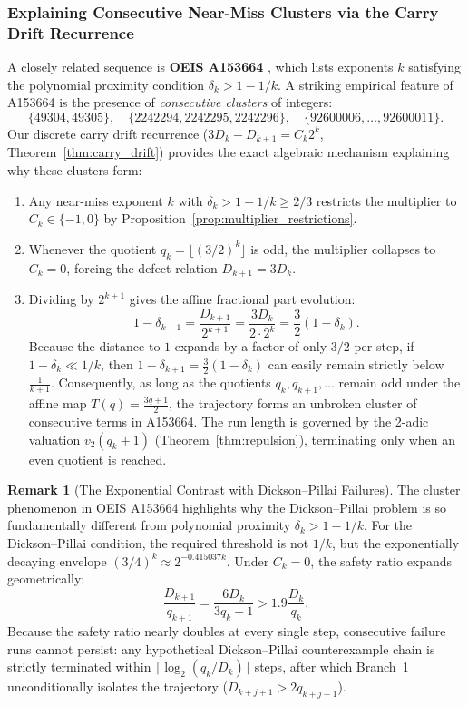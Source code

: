 \documentclass[11pt,reqno]{amsart}
\theoremstyle{definition}
\newtheorem{remark}[theorem]{Remark}
\numberwithin{equation}{section}
\begin{document}
\subsubsection{Explaining Consecutive Near-Miss Clusters via the Carry Drift Recurrence}
A closely related sequence is \textbf{OEIS A153664} \cite{oeisA153664}, which lists exponents $k$ satisfying the polynomial proximity condition $\delta_k > 1 - 1/k$. A striking empirical feature of A153664 is the presence of \emph{consecutive clusters} of integers:
\[
\{49304, 49305\}, \quad \{2242294, 2242295, 2242296\}, \quad \{92600006, \dots, 92600011\}.
\]
Our discrete carry drift recurrence ($3 D_k - D_{k+1} = C_k 2^k$, Theorem~\ref{thm:carry_drift}) provides the exact algebraic mechanism explaining why these clusters form:
\begin{enumerate}
    \item Any near-miss exponent $k$ with $\delta_k > 1 - 1/k \ge 2/3$ restricts the multiplier to $C_k \in \{-1, 0\}$ by Proposition~\ref{prop:multiplier_restrictions}.
    \item Whenever the quotient $q_k = \lfloor (3/2)^k \rfloor$ is odd, the multiplier collapses to $C_k = 0$, forcing the defect relation $D_{k+1} = 3 D_k$.
    \item Dividing by $2^{k+1}$ gives the affine fractional part evolution:
    \begin{equation}
    1 - \delta_{k+1} = \frac{D_{k+1}}{2^{k+1}} = \frac{3 D_k}{2 \cdot 2^k} = \frac{3}{2}(1 - \delta_k).
    \end{equation}
    Because the distance to $1$ expands by a factor of only $3/2$ per step, if $1 - \delta_k \ll 1/k$, then $1 - \delta_{k+1} = \frac{3}{2}(1 - \delta_k)$ can easily remain strictly below $\frac{1}{k+1}$.
    Consequently, as long as the quotients $q_k, q_{k+1}, \dots$ remain odd under the affine map $T(q) = \frac{3q+1}{2}$, the trajectory forms an unbroken cluster of consecutive terms in A153664. The run length is governed by the 2-adic valuation $v_2(q_k + 1)$ (Theorem~\ref{thm:repulsion}), terminating only when an even quotient is reached.
\end{enumerate}

\begin{remark}[The Exponential Contrast with Dickson--Pillai Failures]
The cluster phenomenon in OEIS A153664 highlights why the Dickson--Pillai problem is so fundamentally different from polynomial proximity $\delta_k > 1 - 1/k$.
For the Dickson--Pillai condition, the required threshold is not $1/k$, but the exponentially decaying envelope $(3/4)^k \approx 2^{-0.415037 k}$.
Under $C_k = 0$, the safety ratio expands geometrically:
\begin{equation}
\frac{D_{k+1}}{q_{k+1}} = \frac{6 D_k}{3 q_k + 1} > 1.9 \frac{D_k}{q_k}.
\end{equation}
Because the safety ratio nearly doubles at every single step, consecutive failure runs cannot persist: any hypothetical Dickson--Pillai counterexample chain is strictly terminated within $\lceil \log_2(q_k / D_k) \rceil$ steps, after which Branch~1 unconditionally isolates the trajectory ($D_{k+j+1} > 2 q_{k+j+1}$).
\end{remark}
\end{document}
